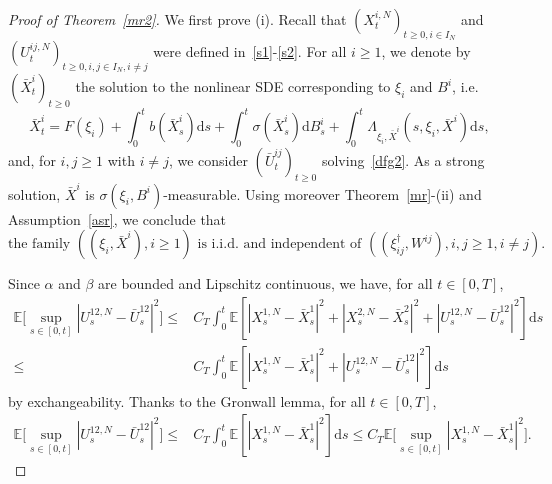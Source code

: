 \documentclass{amsart}
\newcommand{\E}{\mathbb{E}}
\newcommand{\bX}{\bar X}
\newcommand{\bU}{\bar U}
\newcommand{\vmark}{\xi}
\newcommand{\emark}{\vmark^\dagger}
\newcommand{\dd}{{\mathrm{d}}}
\begin{document}
\begin{proof}[Proof of Theorem~\ref{mr2}]
We first prove (i).
Recall that $(X^{i,N}_t)_{t\geq 0,i \in I_N}$ and $(U^{ij,N}_t)_{t\geq 0, i,j \in I_N,i\neq j}$ were
defined in~\eqref{s1}-\eqref{s2}.
For all $i \geq 1$, we denote by $(\bX^i_t)_{t\geq 0}$ the solution to the nonlinear SDE
corresponding to $\vmark_i$ and $B^i$, i.e.
\begin{equation}\label{bX}
\bX^i_t=F(\vmark_i)+\int_0^t b(\bX^i_s)\dd s + \int_0^t \sigma(\bX^i_s)\dd B^i_s+
\int_0^t \Lambda_{\vmark_i,\bX^i}(s,\vmark_i,\bX^i) \dd s,
\end{equation}
and, for $i,j \geq 1$ with $i\neq j$, we consider $(\bU^{ij}_t)_{t\geq 0}$ solving~\eqref{dfg2}.
As a strong solution, $\bX^i$ is
$\sigma(\vmark_i,B^i)$-measurable. Using moreover Theorem~\ref{mr}-(ii) and
Assumption~\ref{asr}, we conclude that
\begin{equation}\label{ind}
\text{the family $((\vmark_i,\bX^i), i\geq 1)$ is i.i.d. and independent of $((\emark_{ij},W^{ij}), i,j\geq 1,  i\neq j)$.}
\end{equation}

Since $\alpha$ and $\beta$ are bounded and Lipschitz continuous, we have,
for all $t\in [0,T]$,
\begin{align*}
\E\Big[\sup_{s\in [0,t]}|U^{12,N}_s-\bU^{12}_s|^2\Big] \leq& C_T \int_0^t \E[|X^{1,N}_s-\bX^1_s|^2+|X^{2,N}_s-\bX^2_s|^2
+ |U^{12,N}_s-\bU^{12}_s|^2] \dd s\\
\leq&  C_T \int_0^t \E[|X^{1,N}_s-\bX^1_s|^2
+ |U^{12,N}_s-\bU^{12}_s|^2] \dd s
\end{align*}
by exchangeability. Thanks to the Gronwall lemma, for all $t \in [0,T]$,
\begin{align}
\E\Big[\sup_{s\in [0,t]}|U^{12,N}_s-\bU^{12}_s|^2\Big] \leq& C_T \int_0^t \E[|X^{1,N}_s-\bX^1_s|^2] \dd s
\leq C_T \E\Big[\sup_{s\in [0,t]}|X^{1,N}_s-\bX^1_s|^2\Big]. \label{ttt1}
\end{align}


\end{proof}
\end{document}
